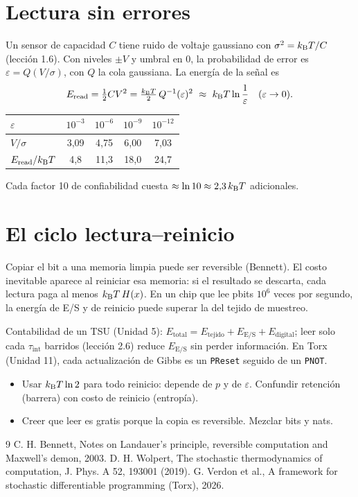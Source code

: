 \documentclass[11pt,a4paper]{article}
\begin{document}
\section{Lectura sin errores}
Un sensor de capacidad $C$ tiene ruido de voltaje gaussiano con $\sigma^2=k_{\mathrm B} T/C$ (lección 1.6). Con niveles $\pm V$ y umbral en 0, la
probabilidad de error es $\varepsilon=Q(V/\sigma)$, con $Q$ la cola gaussiana. La energía de la señal es
\begin{equation}
E_{\text{read}}=\tfrac12CV^2=\tfrac{k_{\mathrm B} T}{2}\,Q^{-1}(\varepsilon)^2\ \approx\ k_{\mathrm B} T\ln\frac1\varepsilon\quad(\varepsilon\to0).
\end{equation}
\begin{center}\begin{tabular}{lcccc}\toprule
$\varepsilon$ & $10^{-3}$ & $10^{-6}$ & $10^{-9}$ & $10^{-12}$\\\midrule
$V/\sigma$ & 3,09 & 4,75 & 6,00 & 7,03\\
$E_{\text{read}}/k_{\mathrm B} T$ & 4,8 & 11,3 & 18,0 & 24,7\\\bottomrule\end{tabular}\end{center}
Cada factor 10 de confiabilidad cuesta $\approx\ln10\approx2{,}3\,k_{\mathrm B} T$ adicionales.

\section{El ciclo lectura--reinicio}
Copiar el bit a una memoria limpia puede ser reversible (Bennett). El costo inevitable aparece al reiniciar esa memoria: si el resultado se
descarta, cada lectura paga al menos $k_{\mathrm B} T\,H(x)$. En un chip que lee pbits $10^6$ veces por segundo, la energía de E/S y de reinicio puede
superar la del tejido de muestreo.

\begin{aplicacion}
Contabilidad de un TSU (Unidad 5): $E_{\text{total}}=E_{\text{tejido}}+E_{\text{E/S}}+E_{\text{digital}}$; leer solo cada
$\tau_{\text{int}}$ barridos (lección 2.6) reduce $E_{\text{E/S}}$ sin perder información. En Torx (Unidad 11), cada actualización de Gibbs
es un \texttt{PReset} seguido de un \texttt{PNOT}.
\end{aplicacion}

\begin{error}
\begin{itemize}[nosep]
\item Usar $k_{\mathrm B} T\ln2$ para todo reinicio: depende de $p$ y de $\varepsilon$. \quad Confundir retención (barrera) con costo de reinicio (entropía).
\item Creer que leer es gratis porque la copia es reversible. \quad Mezclar bits y nats.
\end{itemize}
\end{error}

\begin{thebibliography}{9}\small
{} C. H. Bennett, Notes on Landauer's principle, reversible computation and Maxwell's demon, 2003.
 D. H. Wolpert, The stochastic thermodynamics of computation, J. Phys. A 52, 193001 (2019).
 G. Verdon et al., A framework for stochastic differentiable programming (Torx), 2026.
\end{thebibliography}
\end{document}
